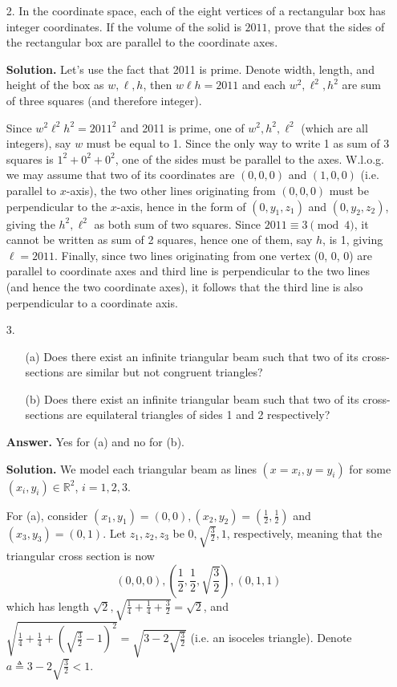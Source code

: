 \documentclass[11pt,a4paper]{article}
\begin{document}
\begin{enumerate}
	\item [2.] In the coordinate space, each of the eight vertices of a rectangular box has integer coordinates. If the volume of the solid is $2011$, prove that the sides of the rectangular box are parallel to the coordinate axes.
	
	\textbf{Solution.} Let's use the fact that 2011 is prime. Denote width, length, and height of the box as $w, \ell, h$, then $w\ell h=2011$ and each $w^2, \ell^2, h^2$ are sum of three squares (and therefore integer). 
	
	Since $w^2\ell^2h^2=2011^2$ and 2011 is prime, one of $w^2, h^2, \ell^2$ (which are all integers), say $w$ must be equal to 1. Since the only way to write 1 as sum of 3 squares is $1^2+0^2+0^2$, one of the sides must be parallel to the axes. W.l.o.g. we may assume that two of its coordinates are $(0, 0, 0)$ and $(1, 0, 0)$ (i.e. parallel to $x$-axis), the two other lines originating from $(0, 0, 0)$ must be perpendicular to the $x$-axis, hence in the form of $(0, y_1, z_1)$ and $(0, y_2, z_2)$, giving the $h^2, \ell^2$ as both sum of two squares. Since $2011\equiv 3\pmod{4}$, it cannot be written as sum of 2 squares, hence one of them, say $h$, is 1, giving $\ell=2011$. Finally, since two lines originating from one vertex (0, 0, 0) are parallel to coordinate axes and third line is perpendicular to the two lines (and hence the two coordinate axes), it follows that the third line is also perpendicular to a coordinate axis. 
	
	\item [3.] 
	\begin{enumerate}
		\item [(a)]
		Does there exist an infinite triangular beam such that two of its cross-sections are similar
		but not congruent triangles?
		
		\item [(b)]
		Does there exist an infinite triangular beam such that two of its cross-sections are equilateral triangles of sides 1 and 2 respectively?
	\end{enumerate}
    
    \textbf{Answer.} Yes for (a) and no for (b). 
    
    \textbf{Solution.} We model each triangular beam as lines $(x = x_i, y = y_i)$ for some $(x_i, y_i)\in\mathbb{R}^2$, 
    $i=1, 2, 3$. 
    
    For (a), consider $(x_1, y_1) = (0, 0), (x_2, y_2) = (\frac 12, \frac 12)$ and $(x_3, y_3) = (0, 1)$. 
    Let $z_1, z_2, z_3$ be $0, \sqrt{\frac 32}, 1$, respectively, meaning that the triangular cross section is now 
    \[
    (0, 0, 0), (\frac 12, \frac 12, \sqrt{\frac 32}), (0, 1, 1)
    \]
    which has length $\sqrt{2}, \sqrt{\frac 14 + \frac 14 + \frac 32} = \sqrt{2}$, 
    and $\sqrt{\frac 14 + \frac 14 + (\sqrt{\frac 32} - 1)^2} = \sqrt{3 - 2\sqrt{\frac 32}}$ 
    (i.e. an isoceles triangle). 
    Denote $a\triangleq 3 - 2\sqrt{\frac 32} < 1$. 
    

\end{enumerate}
\end{document}
